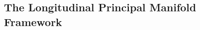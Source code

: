 \documentclass[12pt]{article}
\theoremstyle{definition}
\begin{document}


\subsection{The Longitudinal Principal Manifold Framework}\label{section: The Longitudinal Principal Manifold Framework}
\end{document}
